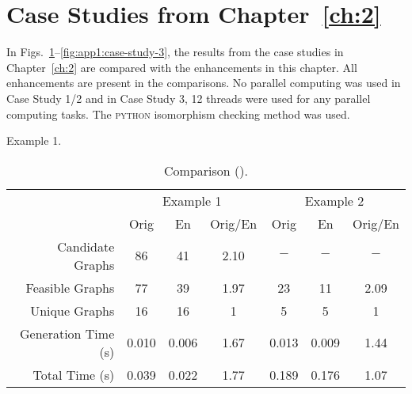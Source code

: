 \section[Case Studies from Chapter~2]{Case Studies from Chapter~\ref{ch:2}}
In Figs.~\ref{fig:app1:case-study-1}--\ref{fig:app1:case-study-3}, the results from the case studies in Chapter~\ref{ch:2} are compared with the enhancements in this chapter. All enhancements are present in the comparisons. No parallel computing was used in Case Study 1/2 and in Case Study 3, 12 threads were used for any parallel computing tasks. The \textsc{python} isomorphism checking method was used.

\begin{table}[ht]
	\centering
	\caption{Example 1.}
	\begin{tabular}{r | c | c | c | c | c | c}
	\hline \hline
	& \multicolumn{3}{c|}{Example 1} & \multicolumn{3}{c}{Example 2} \\
	& Orig & En & Orig/En & Orig & En & Orig/En \\
	\hline
	Candidate Graphs & 86 & 41 & 2.10 & $-$ & $-$ & $-$ \\
	Feasible Graphs & 77 & 39 & 1.97 & 23 & 11 & 2.09 \\ 
	Unique Graphs & 16 & 16 & 1 & 5 & 5 & 1 \\ 
	Generation Time (s) & 0.010 & 0.006 & 1.67 & 0.013 & 0.009 & 1.44 \\
	Total Time (s) & 0.039 & 0.022 & 1.77 & 0.189 & 0.176& 1.07 \\
	\hline \hline
	\end{tabular}

    \caption{Comparison ().\label{fig:app1:case-study-1}}

\end{table}

